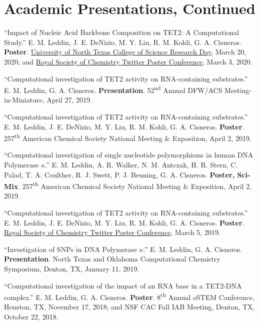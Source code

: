 \documentclass[letterpaper,11pt]{article}
\begin{document}
\section{Academic Presentations, Continued}
\begin{etaremune}[start=12]
\small{
  \item \textnormal{``Impact of Nucleic Acid Backbone Composition on TET2: A Computational Study.'' E. M. Leddin, J. E. DeNizio, M. Y. Liu, R. M. Kohli, G. A. Cisneros. \textbf{Poster}. \href{https://twitter.com/EmLedd1/status/1239679717575360512?s=20}{University of North Texas College of Science Research Day}, March 20, 2020; and \href{https://twitter.com/EmLedd1/status/1234811448720797696?s=20}{Royal Society of Chemistry Twitter Poster Conference}, March 3, 2020.}
  \item \textnormal{``Computational investigation of TET2 activity on RNA-containing substrates.'' E. M. Leddin, G. A. Cisneros. \textbf{Presentation}. 52\textsuperscript{nd} Annual DFW/ACS Meeting-in-Miniature, April 27, 2019.}
  \item \textnormal{``Computational investigation of TET2 activity on RNA-containing substrates.'' E. M. Leddin, J. E. DeNizio, M. Y. Liu, R. M. Kohli, G. A. Cisneros. \textbf{Poster}. 257\textsuperscript{th} American Chemical Society National Meeting \& Exposition, April 2, 2019.}
  \item \textnormal{``Computational investigation of single nucleotide polymorphisms in human DNA Polymerase $\kappa$.'' E. M. Leddin, A. R. Walker, N. M. Antczak, H. R. Stern, C. Palad, T. A. Coulther, R. J. Swett, P. J. Beuning, G. A. Cisneros. \textbf{Poster, Sci-Mix}. 257\textsuperscript{th} American Chemical Society National Meeting \& Exposition, April 2, 2019.}
  \item \textnormal{``Computational investigation of TET2 activity on RNA-containing substrates.'' E. M. Leddin, J. E. DeNizio, M. Y. Liu, R. M. Kohli, G. A. Cisneros. \textbf{Poster}. \href{https://twitter.com/EmLedd1/status/1103107933951459333?s=20}{Royal Society of Chemistry Twitter Poster Conference}, March 5, 2019.}
  \item \textnormal{``Investigation of SNPs in DNA Polymerase $\kappa$.'' E. M. Leddin, G. A. Cisneros. \textbf{Presentation}. North Texas and Oklahoma Computational Chemistry Symposium, Denton, TX, January 11, 2019.}
  \item \textnormal{``Computational investigation of the impact of an RNA base in a TET2-DNA complex.'' E. M. Leddin, G. A. Cisneros. \textbf{Poster}. 8\textsuperscript{th} Annual oSTEM Conference, Houston, TX, November 17, 2018; and NSF CAC Fall IAB Meeting, Denton, TX, October 22, 2018.}
}
\end{etaremune}
\end{document}
